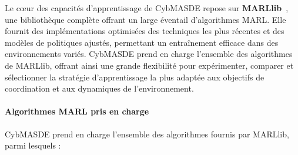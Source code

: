 Le cœur des capacités d'apprentissage de CybMASDE repose sur \textbf{MARLlib}~\cite{hu2022marllib}, une bibliothèque complète offrant un large éventail d'algorithmes MARL. Elle fournit des implémentations optimisées des techniques les plus récentes et des modèles de politiques ajustés, permettant un entraînement efficace dans des environnements variés. CybMASDE prend en charge l'ensemble des algorithmes de MARLlib, offrant ainsi une grande flexibilité pour expérimenter, comparer et sélectionner la stratégie d'apprentissage la plus adaptée aux objectifs de coordination et aux dynamiques de l'environnement.

\paragraph{Algorithmes MARL pris en charge}
CybMASDE prend en charge l'ensemble des algorithmes fournis par MARLlib, parmi lesquels :

